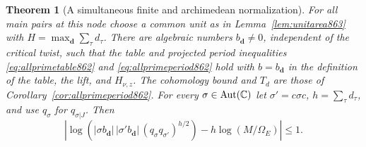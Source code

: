 \documentclass[a4paper,11pt]{article}
\newtheorem{theorem}[proposition]{Theorem}
\theoremstyle{definition}
\theoremstyle{remark}
\numberwithin{equation}{section}
\begin{document}
\begin{theorem}[A simultaneous finite and archimedean normalization]
\leavevmode\label{thm:jetscale863}
For all main pairs at this node choose a common unit as in
Lemma~\ref{lem:unitarea863} with \(H=\max_{\mathbf d}\sum_\tau d_\tau\).
There are algebraic numbers \(b_{\mathbf d}\ne0\), independent of
the critical twist, such that the table and projected period
inequalities \eqref{eq:allprimetable862} and
\eqref{eq:allprimeperiod862} hold with \(b=b_{\mathbf d}\) in the
definition of the table, the lift, and \(H_{\nu,z}\). The cohomology
bound and \(T_d\) are those of Corollary~\ref{cor:allprimeperiod862}.
For every \(\sigma\in\operatorname{Aut}(\mathbb C)\) let
\(\sigma'=c\sigma c\), \(h=\sum_\tau d_\tau\), and use \(q_\sigma\)
for \(q_{\sigma|J}\). Then
\begin{equation}
 \left|\log\!\left(
    |\sigma b_{\mathbf d}|\,|\sigma' b_{\mathbf d}|\,
           (q_\sigma q_{\sigma'})^{h/2}\right)
               -h\log(M/\Omega_E)\right|\le 1 .
 \label{eq:jetpair863}
\end{equation}
\end{theorem}
\end{document}

